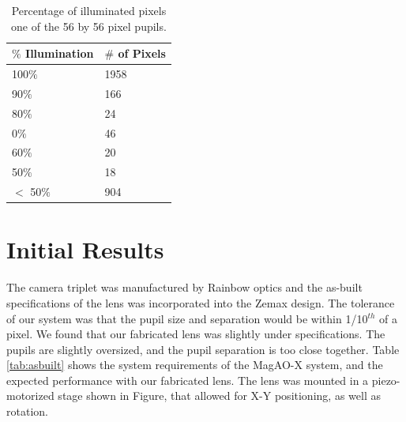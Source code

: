 \begin{table}[h]
	\begin{center}       
		\begin{tabular}{|l|l|} %
				
				\hline%
				\rule[-1ex]{0pt}{3.5ex} $\%$ \textbf{Illumination} & \textbf{$\#$ of Pixels }  \\
				
				\hline%
				\rule[-1ex]{0pt}{3.5ex} 100$\%$ & 1958  \\
				\hline%
				\rule[-1ex]{0pt}{3.5ex} 90$\%$ & 166  \\
				\hline%
				\rule[-1ex]{0pt}{3.5ex} 80$\%$ & 24  \\
				\hline%
				\rule[-1ex]{0pt}{3.5ex} 0$\%$ & 46  \\
				\hline%
				\rule[-1ex]{0pt}{3.5ex} 60$\%$ & 20  \\
				\hline%
				\rule[-1ex]{0pt}{3.5ex} 50$\%$ & 18  \\
				\hline%
				\rule[-1ex]{0pt}{3.5ex} $<$ 50$\%$ & 904  \\
				\hline
		\end{tabular}
	\end{center}
	\caption{Percentage of illuminated pixels one of the 56 by 56 pixel pupils. }
	\label{tab:actuators}
\end{table}
	
\section{Initial Results}
	
The camera triplet was manufactured by Rainbow optics and the as-built specifications of the lens was incorporated into the Zemax design. The tolerance of our system was that the pupil size and separation would be within 1/10$^{th}$ of a pixel. We found that our fabricated lens was slightly under specifications. The pupils are slightly oversized, and the pupil separation is too close together. Table \ref{tab:asbuilt} shows the system requirements of the MagAO-X system, and the expected performance with our fabricated lens. The lens was mounted in a piezo-motorized stage shown in Figure, that allowed for X-Y positioning, as well as rotation. 
	
